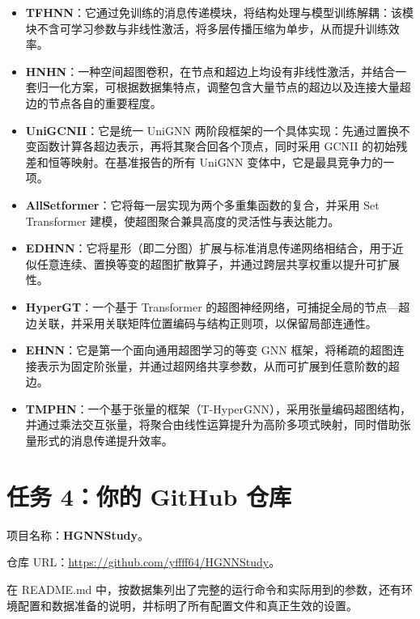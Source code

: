 \documentclass[11pt,a4paper]{article}
\begin{document}
\begin{itemize}
\item \textbf{TFHNN}\cite{tang2025tfhnn}：它通过免训练的消息传递模块，将结构处理与模型训练解耦：该模块不含可学习参数与非线性激活，将多层传播压缩为单步，从而提升训练效率。
\item \textbf{HNHN}\cite{dong2020hnhn}：一种空间超图卷积，在节点和超边上均设有非线性激活，并结合一套归一化方案，可根据数据集特点，调整包含大量节点的超边以及连接大量超边的节点各自的重要程度。
\item \textbf{UniGCNII}\cite{huang2021unignn}：它是统一 UniGNN 两阶段框架的一个具体实现：先通过置换不变函数计算各超边表示，再将其聚合回各个顶点，同时采用 GCNII 的初始残差和恒等映射。在基准报告的所有 UniGNN 变体中，它是最具竞争力的一项。
\item \textbf{AllSetformer}\cite{chien2022allset}：它将每一层实现为两个多重集函数的复合，并采用 Set Transformer 建模，使超图聚合兼具高度的灵活性与表达能力。
\item \textbf{EDHNN}\cite{wang2023edhnn}：它将星形（即二分图）扩展与标准消息传递网络相结合，用于近似任意连续、置换等变的超图扩散算子，并通过跨层共享权重以提升可扩展性。
\item \textbf{HyperGT}\cite{liu2024hypergt}：一个基于 Transformer 的超图神经网络，可捕捉全局的节点—超边关联，并采用关联矩阵位置编码与结构正则项，以保留局部连通性。
\item \textbf{EHNN}\cite{kim2022ehnn}：它是第一个面向通用超图学习的等变 GNN 框架，将稀疏的超图连接表示为固定阶张量，并通过超网络共享参数，从而可扩展到任意阶数的超边。
\item \textbf{TMPHN}\cite{wang2024tmphn}：一个基于张量的框架（T-HyperGNN），采用张量编码超图结构，并通过乘法交互张量，将聚合由线性运算提升为高阶多项式映射，同时借助张量形式的消息传递提升效率。
\end{itemize}

\section*{任务 4：你的 GitHub 仓库}
项目名称：\textbf{HGNNStudy}。\par
仓库 URL：\url{https://github.com/yffff64/HGNNStudy}。\par
在 README.md 中，按数据集列出了完整的运行命令和实际用到的参数，还有环境配置和数据准备的说明，并标明了所有配置文件和真正生效的设置。



\end{document}
